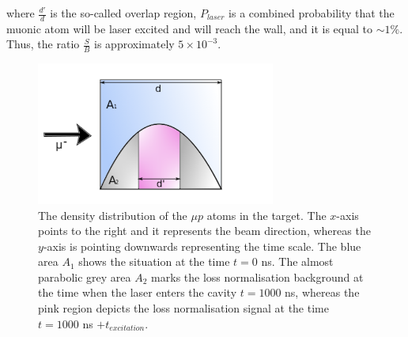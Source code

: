 \documentclass[12pt]{article}
\begin{document}
where $\frac{d'}{d}$ is the so-called overlap region, $P_{laser}$ is a combined probability that the muonic atom will be laser excited and will reach the wall, and it is equal to $\sim 1 \%$. Thus, the ratio $\frac{S}{B}$ is approximately $5 \times 10^{-3}$.
\begin{figure}[!htbp]
\centering
\includegraphics[width=0.7\textwidth]{img/diffusion2.png}
\caption{The density distribution of the $\mu{p}$ atoms in the target. The $x$-axis points to the right and it represents the beam direction, whereas the $y$-axis is pointing downwards representing the time scale. The blue area $A_1$ shows the situation at the time $t = 0$ ns. The almost parabolic grey area $A_2$ marks the loss normalisation background at the time when the laser enters the cavity $t = 1000$ ns, whereas the pink region depicts the loss normalisation signal at the time $t = 1000$ ns $ + t_{excitation}$.}
\label{fig:diffusion}
\end{figure}
\end{document}
